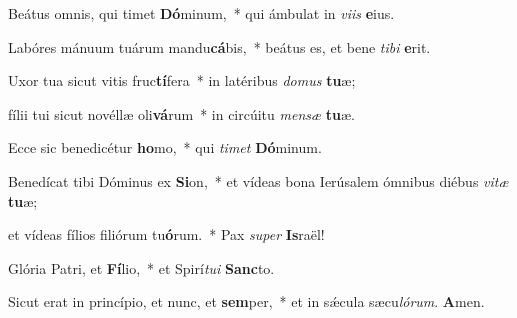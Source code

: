 \item Beátus omnis, qui timet \textbf{Dó}minum,~* qui ámbulat in \textit{vi}\textit{is} \textbf{e}ius.

\item Labóres mánuum tuárum mandu\textbf{cá}bis,~* beátus es, et bene \textit{ti}\textit{bi} \textbf{e}rit.

\item Uxor tua sicut vitis fruc\textbf{tí}fera~* in latéribus \textit{do}\textit{mus} \textbf{tu}æ;

\item fílii tui sicut novéllæ oli\textbf{vá}rum~* in circúitu \textit{men}\textit{sæ} \textbf{tu}æ.

\item Ecce sic benedicétur \textbf{ho}mo,~* qui \textit{ti}\textit{met} \textbf{Dó}minum.

\item Benedícat tibi Dóminus ex \textbf{Si}on,~* et vídeas bona Ierúsalem ómnibus diébus \textit{vi}\textit{tæ} \textbf{tu}æ;

\item et vídeas fílios filiórum tu\textbf{ó}rum.~* Pax \textit{su}\textit{per} \textbf{Is}raël!

\item Glória Patri, et \textbf{Fí}lio,~* et Spirí\textit{tu}\textit{i} \textbf{Sanc}to.

\item Sicut erat in princípio, et nunc, et \textbf{sem}per,~* et in sǽcula sæcu\textit{ló}\textit{rum}. \textbf{A}men.